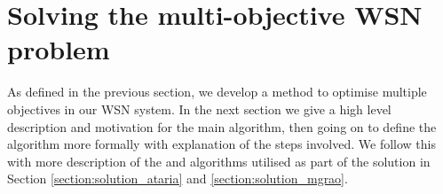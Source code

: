 \section{Solving the multi-objective WSN problem}
\label{section:solution}

As defined in the previous section, we develop a method to optimise multiple objectives in our WSN system. In the next section we give a high level description and motivation for the main \acronymWSNOptimisation{}{} algorithm, then going on to define the algorithm more formally with explanation of the steps involved. We follow this with more description of the \acronymATARIA{}{} and \acronymMGRAO{}{} algorithms utilised as part of the solution in Section \ref{section:solution_ataria} and \ref{section:solution_mgrao}.
